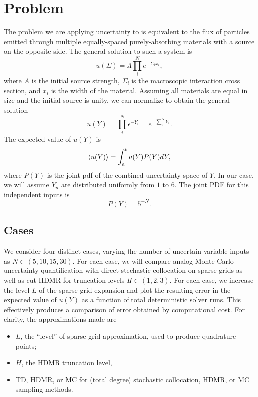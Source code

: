 \documentclass[11pt]{article}
\begin{document}
\section{Problem}
The problem we are applying uncertainty to is equivalent to the flux of particles emitted through multiple equally-spaced purely-absorbing materials with a source on the opposite side.  The general solution to such a system is
\begin{equation}
u(\Sigma) = A\prod_i^N e^{-\Sigma_i x_i},
\end{equation}
where $A$ is the initial source strength, $\Sigma_i$ is the macroscopic interaction cross section, and $x_i$ is the width of the material.  Assuming all materials are equal in size and the initial source is unity, we can normalize to obtain the general solution
\begin{equation}
u(Y) = \prod_i^N e^{-Y_i}=e^{-\sum_i^N Y_i}.
\end{equation}
The expected value of $u(Y)$ is
\begin{equation}
\expval{u(Y)} = \int_a^b u(Y)P(Y)dY,
\end{equation}
where $P(Y)$ is the joint-pdf of the combined uncertainty space of $Y$.  In our case, we will assume $Y_n$ are distributed uniformly from $1$ to $6$.  The joint PDF for this independent inputs is 
\begin{equation}
P(Y)=5^{-N}.
\end{equation}

\subsection{Cases}
We consider four distinct cases, varying the number of uncertain variable inputs as $N\in(5,10,15,30)$.  For each case, we will compare analog Monte Carlo uncertainty quantification with direct stochastic collocation on sparse grids as well as cut-HDMR for truncation levels $H\in(1,2,3)$.  For each case, we increase the level $L$ of the sparse grid expansion and plot the resulting error in the expected value of $u(Y)$ as a function of total deterministic solver runs.  This effectively produces a comparison of error obtained by computational cost.  For clarity, the approximations made are
\begin{itemize}
\item $L$, the ``level'' of sparse grid approximation, used to produce quadrature points;
\item $H$, the HDMR truncation level,
\item TD, HDMR, or MC for (total degree) stochastic collocation, HDMR, or MC sampling methods.
\end{itemize}
\end{document}
